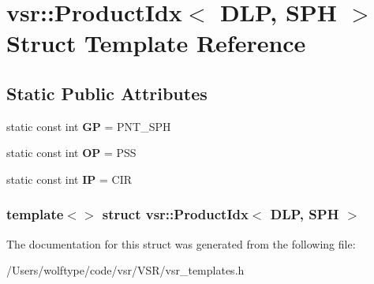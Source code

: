 \hypertarget{structvsr_1_1_product_idx_3_01_d_l_p_00_01_s_p_h_01_4}{\section{vsr\-:\-:Product\-Idx$<$ D\-L\-P, S\-P\-H $>$ Struct Template Reference}
\label{structvsr_1_1_product_idx_3_01_d_l_p_00_01_s_p_h_01_4}
}
\subsection*{Static Public Attributes}
\begin{DoxyCompactItemize}
\item 
\hypertarget{structvsr_1_1_product_idx_3_01_d_l_p_00_01_s_p_h_01_4_aaaba029528449298611f005666f424df}{static const int {\bfseries G\-P} = P\-N\-T\-\_\-\-S\-P\-H}\label{structvsr_1_1_product_idx_3_01_d_l_p_00_01_s_p_h_01_4_aaaba029528449298611f005666f424df}

\item 
\hypertarget{structvsr_1_1_product_idx_3_01_d_l_p_00_01_s_p_h_01_4_abb1029c6e29b7e34d4fad6c9a69dcb2e}{static const int {\bfseries O\-P} = P\-S\-S}\label{structvsr_1_1_product_idx_3_01_d_l_p_00_01_s_p_h_01_4_abb1029c6e29b7e34d4fad6c9a69dcb2e}

\item 
\hypertarget{structvsr_1_1_product_idx_3_01_d_l_p_00_01_s_p_h_01_4_aebf22a5f9d744ffa75d68702e6272dd3}{static const int {\bfseries I\-P} = C\-I\-R}\label{structvsr_1_1_product_idx_3_01_d_l_p_00_01_s_p_h_01_4_aebf22a5f9d744ffa75d68702e6272dd3}

\end{DoxyCompactItemize}
\subsubsection*{template$<$$>$ struct vsr\-::\-Product\-Idx$<$ D\-L\-P, S\-P\-H $>$}



The documentation for this struct was generated from the following file\-:\begin{DoxyCompactItemize}
\item 
/\-Users/wolftype/code/vsr/\-V\-S\-R/vsr\-\_\-templates.\-h\end{DoxyCompactItemize}
